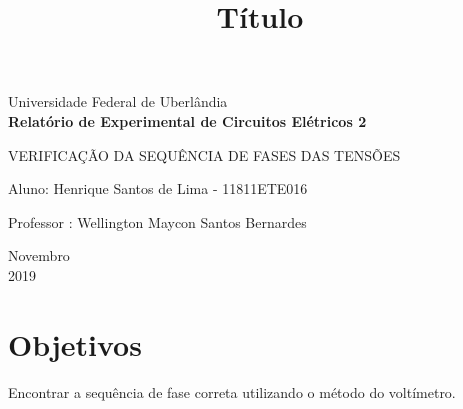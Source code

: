 \documentclass[a4paper, 12pt]{article}
\begin{document}
	\begin{titlepage}
		\begin{center}

			\Huge{Universidade Federal de Uberlândia}\\
			\vspace{15pt}
			\vspace{85pt}
			\textbf{\LARGE{Relatório de Experimental de Circuitos Elétricos 2}}
			\title{\large{Título}}

		\end{center}
		\vspace{1,5cm}
		\begin{flushright}
			\begin{list}{}{
				\setlength{\leftmargin}{4.5cm}
				\setlength{\rightmargin}{0cm}
				\setlength{\labelwidth}{0pt}
				\setlength{\labelsep}{\leftmargin}}
				\item
				VERIFICAÇÃO DA SEQUÊNCIA DE FASES DAS TENSÕES
				\begin{list}{}{
					\setlength{\leftmargin}{0cm}
					\setlength{\rightmargin}{0cm}
					\setlength{\labelwidth}{0pt}
					\setlength{\labelsep}{\leftmargin}}
					\item Aluno:  Henrique Santos de Lima - 11811ETE016\
					\item Professor : Wellington Maycon Santos Bernardes\
				\end{list}
			\end{list}
		\end{flushright}
		\vspace{1cm}
		\begin{center}
			\vspace{\fill}
			Novembro\\
			2019
		\end{center}
	\end{titlepage}
	\tableofcontents
	\thispagestyle{empty}
	\newpage
	\section{Objetivos}
		\justifying
		Encontrar a sequência de fase correta utilizando o método do voltímetro.
\end{document}

